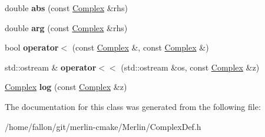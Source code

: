 \begin{DoxyCompactItemize}
double {\bfseries abs} (const \hyperlink{classComplex}{Complex} \&rhs)
\item 
\mbox{\label{classComplex_aad848c12d615222511616b3429c7048f}} 
double {\bfseries arg} (const \hyperlink{classComplex}{Complex} \&rhs)
\item 
\mbox{\label{classComplex_a3e1172e031ba44fa502d8a8b133eb543}} 
bool {\bfseries operator$<$} (const \hyperlink{classComplex}{Complex} \&, const \hyperlink{classComplex}{Complex} \&)
\item 
\mbox{\label{classComplex_a81f946146f25e02aa3077ca2c80afe3c}} 
std\+::ostream \& {\bfseries operator$<$$<$} (std\+::ostream \&os, const \hyperlink{classComplex}{Complex} \&z)
\item 
\mbox{\label{classComplex_aefb0d844617443b811d1b853bd54b278}} 
\hyperlink{classComplex}{Complex} {\bfseries log} (const \hyperlink{classComplex}{Complex} \&z)
\end{DoxyCompactItemize}


The documentation for this class was generated from the following file\+:\begin{DoxyCompactItemize}
\item 
/home/fallon/git/merlin-\/cmake/\+Merlin/Complex\+Def.\+h\end{DoxyCompactItemize}
